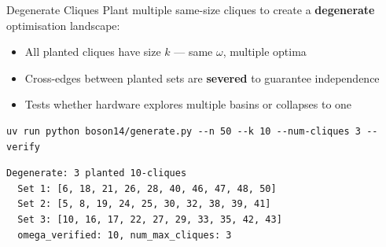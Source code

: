 \documentclass[aspectratio=169]{beamer}
\begin{document}

\begin{frame}[fragile]{Degenerate Cliques}
    Plant multiple same-size cliques to create a \textbf{degenerate} optimisation landscape:

    \begin{itemize}
        \item All planted cliques have size $k$ --- same $\omega$, multiple optima
        \item Cross-edges between planted sets are \textbf{severed} to guarantee independence
        \item Tests whether hardware explores multiple basins or collapses to one
    \end{itemize}

    \vspace{0.5em}
\begin{lstlisting}[style=shell,numbers=none]
uv run python boson14/generate.py --n 50 --k 10 --num-cliques 3 --verify
\end{lstlisting}

\begin{lstlisting}[numbers=none,basicstyle=\ttfamily\scriptsize]
  Degenerate: 3 planted 10-cliques
  Set 1: [6, 18, 21, 26, 28, 40, 46, 47, 48, 50]
  Set 2: [5, 8, 19, 24, 25, 30, 32, 38, 39, 41]
  Set 3: [10, 16, 17, 22, 27, 29, 33, 35, 42, 43]
  omega_verified: 10, num_max_cliques: 3
\end{lstlisting}
\end{frame}

\end{document}
